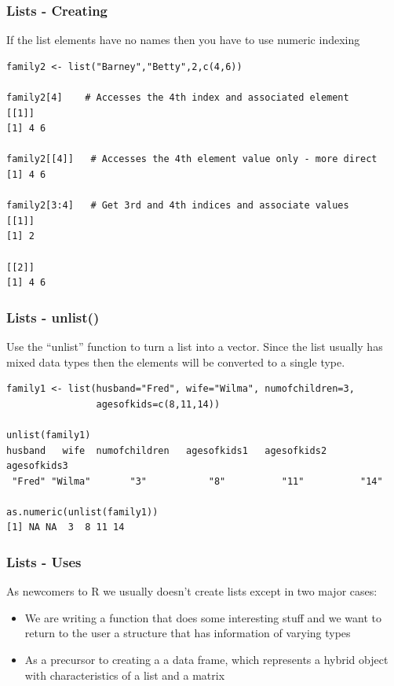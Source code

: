 \documentclass{beamer}
\begin{document}
%
\begin{frame}[fragile]
\frametitle{Lists - Creating}
If the list elements have no names then you have to use numeric indexing
\footnotesize
\begin{verbatim}
family2 <- list("Barney","Betty",2,c(4,6))

family2[4]    # Accesses the 4th index and associated element 
[[1]]
[1] 4 6

family2[[4]]   # Accesses the 4th element value only - more direct
[1] 4 6

family2[3:4]   # Get 3rd and 4th indices and associate values
[[1]]
[1] 2

[[2]]
[1] 4 6

\end{verbatim}
\end{frame}

%
\begin{frame}[fragile]
\frametitle{Lists - unlist()}
Use the ``unlist'' function to turn a list into a vector. Since the list usually has mixed data types then the elements will be converted to a single type.
\footnotesize
\begin{verbatim}
family1 <- list(husband="Fred", wife="Wilma", numofchildren=3, 
                agesofkids=c(8,11,14))
                
unlist(family1)
husband   wife  numofchildren   agesofkids1   agesofkids2   agesofkids3 
 "Fred" "Wilma"       "3"           "8"          "11"          "14" 

as.numeric(unlist(family1))
[1] NA NA  3  8 11 14

\end{verbatim}
\end{frame}

%
\begin{frame}[fragile]
\frametitle{Lists - Uses}
As newcomers to R we usually doesn't create lists except in two major cases:
\begin{itemize}

\item We are writing a function that does some interesting stuff and we want to return to the user
a structure that has information of varying types

\item As a precursor to creating a a data frame, which represents a hybrid object with characteristics of a list and a matrix
\end{itemize}
\footnotesize
\end{frame}
\end{document}
